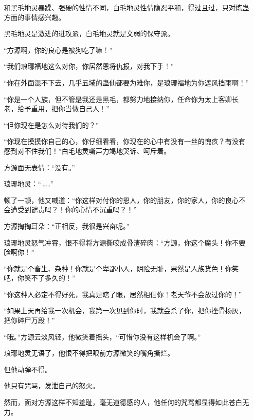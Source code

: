 \begin{this_body}
和黑毛地灵暴躁、强硬的性情不同，白毛地灵性情隐忍平和，得过且过，只对炼蛊方面的事情感兴趣。

黑毛地灵是激进的进攻派，白毛地灵就是文弱的保守派。

“方源啊，你的良心是被狗吃了嘛！”

“我们琅琊福地这么对你，你居然恩将仇报，对我下手！”

“你在外面混不下去，几乎五域的蛊仙都要为难你，是琅琊福地为你遮风挡雨啊！”

“你是一个人族，但不管是我还是黑毛，都努力地接纳你，任命你为太上客卿长老，给予重用，把你当做自己人！”

“但你现在是怎么对待我们的？”

“你现在摸摸你自己的心，你仔细看看，你现在的心中有没有一丝的愧疚？有没有感到对不住我们！”白毛地灵嘶声力竭地哭诉、呵斥着。

方源面无表情：“没有。”

琅琊地灵：“……”

顿了一顿，他又喊道：“你这样对付你的恩人，你的朋友，你的家人，你的良心不会遭受到谴责吗？！你的心情不沉重吗？！”

方源掏掏耳朵：“正相反，我很是兴奋呢。”

琅琊地灵怒气冲霄，恨不得将方源撕咬成骨渣碎肉：“方源，你这个魔头！你不要脸啊你！”

“你就是个畜生、杂种！你就是个卑鄙小人，阴险无耻，果然是人族货色！你笑吧，你笑不了多久的！”

“你这种人必定不得好死，我真是瞎了眼，居然相信你！老天爷不会放过你的！”

“如果上天再给我一次机会，我第一次见到你时，我就会杀了你，把你挫骨扬灰，把你碎尸万段！”

“哦。”方源云淡风轻，他微笑着摇头，“可惜你没有这样机会了啊。”

琅琊地灵无语了，他恨不得把眼前方源微笑的嘴角撕烂。

但他动弹不得。

他只有咒骂，发泄自己的怒火。

然而，面对方源这样不知羞耻，毫无道德感的人，他任何的咒骂都显得如此苍白无力。

\end{this_body}

